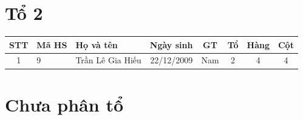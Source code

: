 
\section*{Tổ 2}
\begin{longtable}{|c|l|p{5cm}|c|c|c|c|c|}
\hline
STT & Mã HS & Họ và tên & Ngày sinh & GT & Tổ & Hàng & Cột \\
\hline
1 & 9 & Trần Lê Gia Hiếu & 22/12/2009 & Nam & 2 & 4 & 4 \\
\hline
\end{longtable}

\section*{Chưa phân tổ}
